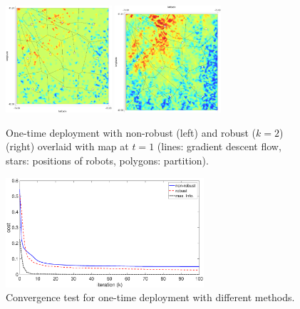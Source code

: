 \documentclass[letterpaper, 10 pt, conference]{ieeeconf}
\begin{document}
\begin{figure}
		\centering
  	\includegraphics[width=1.55in]{figure/order1deploy2d}
  	  	\includegraphics[width=1.55in]{figure/order2deploy2d}
	\caption{One-time deployment with non-robust (left) and robust ($k=2$) (right) overlaid with map at $t=1$ (lines: gradient descent flow, stars: positions of robots, polygons: partition).}
	\label{fig:fig2}
\end{figure}

\begin{figure}
	\centering
	\includegraphics[width=2.9in]{figure/cost_comp1}
	\caption{Convergence test for one-time deployment with different methods.}
	\label{fig:fig0}
\end{figure}
\end{document}
